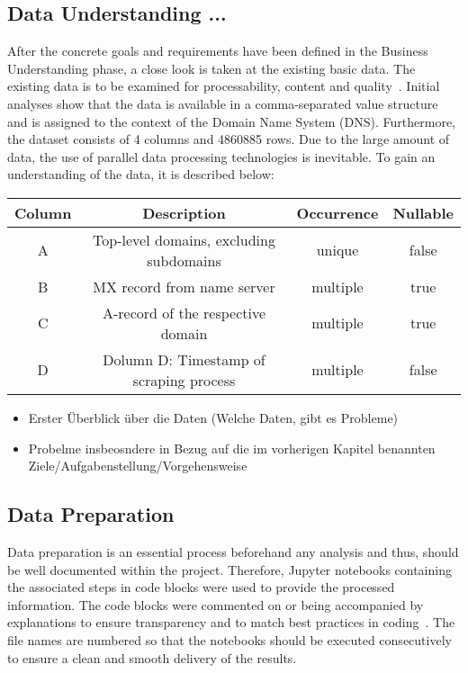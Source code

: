 \subsection{Data Understanding ...}\label{subsec:dataunderstanding}
After the concrete goals and requirements have been defined in the Business Understanding phase, a close look is taken at the existing basic data.
The existing data is to be examined for processability, content and quality~\autocite[cf.][]{Semmelmann.2020}.
Initial analyses show that the data is available in a comma-separated value structure and is assigned to the context of the Domain Name System (DNS).
Furthermore, the dataset consists of 4 columns and 4860885 rows.
Due to the large amount of data, the use of parallel data processing technologies is inevitable.
To gain an understanding of the data, it is described below:

\begin{center}
    \begin{tabular}{||c c c c||} 
    \hline
    Column & Description & Occurrence & Nullable \\ [0.5ex] 
    \hline\hline
    A & Top-level domains, excluding subdomains & unique & false \\ 
    \hline
    B & MX record from name server & multiple & true \\
    \hline
    C & A-record of the respective domain & multiple & true \\
    \hline
    D & Dolumn D: Timestamp of scraping process & multiple & false
   \end{tabular}
   \end{center}

\begin{itemize}
    \item Erster Überblick über die Daten (Welche Daten, gibt es Probleme)
    \item Probelme insbeosndere in Bezug auf die im vorherigen Kapitel benannten Ziele/Aufgabenstellung/Vorgehensweise
\end{itemize}

\subsection{Data Preparation}\label{subsec:datapreparation}
Data preparation is an essential process beforehand any analysis and thus, should be well documented within the project.
Therefore, Jupyter notebooks containing the associated steps in code blocks were used to provide the processed information.
The code blocks were commented on or being accompanied by explanations to ensure transparency and to match best practices in coding~\autocite[cf.][]{Kosourova.2021}.
The file names are numbered so that the notebooks should be executed consecutively to ensure a clean and smooth delivery of the results.

